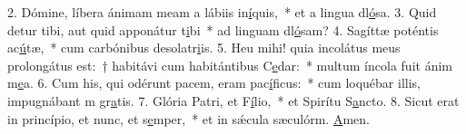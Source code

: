 2. Dómine, líbera ánimam meam a lábiis in\uline{í}quis,~* et a lingua dl\uline{ó}sa.
3. Quid detur tibi, aut quid apponátur t\uline{i}bi~* ad linguam dl\uline{ó}sam?
4. Sagíttæ poténtis ac\uline{ú}tæ,~* cum carbónibus desolatr\uline{i}is.
5. Heu mihi! quia incolátus meus prolongátus est:~† habitávi cum habitántibus C\uline{e}dar:~* multum íncola fuit ánim m\uline{e}a.
6. Cum his, qui odérunt pacem, eram pac\uline{í}ficus:~* cum loquébar illis, impugnábant m gr\uline{a}tis.
7. Glória Patri, et F\uline{í}lio,~* et Spirítu S\uline{a}ncto.
8. Sicut erat in princípio, et nunc, et s\uline{e}mper,~* et in sǽcula sæculórm. \uline{A}men.

